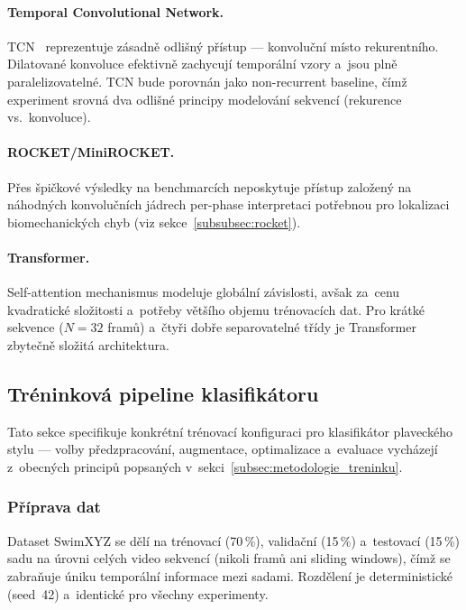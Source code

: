 \paragraph{Temporal Convolutional Network.}
TCN~\cite{bai2018tcn} reprezentuje zásadně odlišný přístup --- konvoluční místo rekurentního. Dilatované konvoluce efektivně zachycují temporální vzory a~jsou plně paralelizovatelné. TCN bude porovnán jako non-recurrent baseline, čímž experiment srovná dva odlišné principy modelování sekvencí (rekurence vs.\ konvoluce).

\paragraph{ROCKET/MiniROCKET.}
Přes špičkové výsledky na benchmarcích neposkytuje přístup založený na náhodných konvolučních jádrech per-phase interpretaci potřebnou pro lokalizaci biomechanických chyb (viz sekce~\ref{subsubsec:rocket}).

\paragraph{Transformer.}
Self-attention mechanismus modeluje globální závislosti, avšak za~cenu kvadratické složitosti a~potřeby většího objemu trénovacích dat. Pro krátké sekvence ($N = 32$ framů) a~čtyři dobře separovatelné třídy je Transformer zbytečně složitá architektura.

\subsection{Tréninková pipeline klasifikátoru}
\label{subsec:treninkov_pipeline}

Tato sekce specifikuje konkrétní trénovací konfiguraci pro klasifikátor plaveckého stylu --- volby předzpracování, augmentace, optimalizace a~evaluace vycházejí z~obecných principů popsaných v~sekci~\ref{subsec:metodologie_treninku}.

\subsubsection{Příprava dat}

Dataset SwimXYZ se dělí na trénovací (70\,\%), validační (15\,\%) a~testovací (15\,\%) sadu na úrovni celých video sekvencí (nikoli framů ani sliding windows), čímž se zabraňuje úniku temporální informace mezi sadami. Rozdělení je deterministické (seed~42) a~identické pro všechny experimenty.

